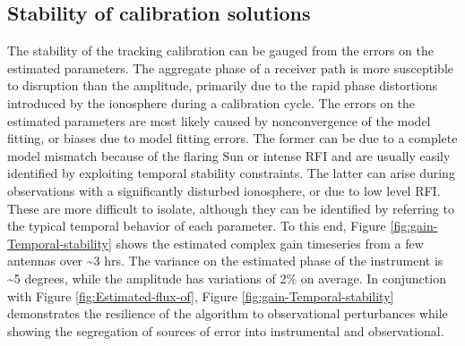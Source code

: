 \documentclass{aa}
\begin{document}
\subsection{\label{sub:Stability}Stability of calibration solutions}
The stability of  the tracking calibration can be gauged from  the errors on the
estimated parameters. The aggregate phase of a receiver path is more susceptible
to disruption than  the amplitude, primarily due to  the rapid phase distortions
introduced  by the  ionosphere during  a calibration  cycle. The  errors  on the
estimated  parameters are  most likely  caused by  nonconvergence of  the model
fitting, or  biases due  to model  fitting errors. The  former can  be due  to a
complete  model mismatch  because of  the flaring  Sun or  intense RFI  and are
usually  easily identified  by exploiting  temporal stability  constraints.  The
latter can arise during  observations with a significantly disturbed ionosphere,
or due to low level RFI.  These are more difficult to isolate, although they can
be identified by referring to  the typical temporal behavior of each parameter.
To  this  end,  Figure  \ref{fig:gain-Temporal-stability}  shows  the  estimated
complex gain  timeseries from a  few antennas over \textasciitilde{}3  hrs.  The
variance on the estimated phase of the instrument is \textasciitilde{}5 degrees,
while  the amplitude  has variations  of 2\%  on average.   In  conjunction with
Figure   \ref{fig:Estimated-flux-of},   Figure  \ref{fig:gain-Temporal-stability}
demonstrates  the resilience  of  the algorithm  to observational  perturbances
while  showing  the  segregation  of  sources of  error  into  instrumental  and
observational.
\end{document}
